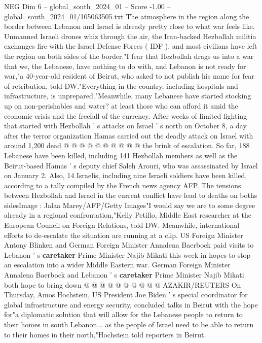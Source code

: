 \begin{textsample}{NEG Dim 6 – global\_south\_2024\_01 – Score -1.00 – global\_south\_2024\_01/105063505.txt}  \label{ex:f6_neg_347}
The atmosphere in the region along the border between Lebanon and Israel is already pretty close to what war feels like.
Unmanned Israeli drones whiz through the air, the Iran-backed Hezbollah militia exchanges fire with the Israel Defense Forces ( IDF ), and most civilians have left the region on both sides of the border."I fear that Hezbollah drags us into a war that we, the Lebanese, have nothing to do with, and Lebanon is not ready for war,"a 40-year-old resident of Beirut, who asked to not publish his name for fear of retribution, told DW."Everything in the country, including hospitals and infrastructure, is unprepared."Meanwhile, many Lebanese have started stocking up on non-perishables and water? at least those who can afford it amid the economic crisis and the freefall of the currency.
After weeks of limited fighting that started with Hezbollah ' s attacks on Israel ' s north on October 8, a day after the terror organization Hamas carried out the deadly attack on Israel with around 1,200 dead @ @ @ @ @ @ @ @ @ @ the brink of escalation.
So far, 188 Lebanese have been killed, including 141 Hezbollah members as well as the Beirut-based Hamas ' s deputy chief Saleh Arouri, who was assassinated by Israel on January 2.
Also, 14 Israelis, including nine Israeli soldiers have been killed, according to a tally compiled by the French news agency AFP.
The tensions between Hezbollah and Israel in the current conflict have lead to deaths on boths sidesImage : Jalaa Marey/AFP/Getty Images"I would say we are to some degree already in a regional confrontation,"Kelly Petillo, Middle East researcher at the European Council on Foreign Relations, told DW.
Meanwhile, international efforts to de-escalate the situation are running at a clip.
US Foreign Minister Antony Blinken and German Foreign Minister Annalena Baerbock paid visits to Lebanon ' s \textbf{caretaker} Prime Minister Najib Mikati this week in hopes to stop an escalation into a wider Middle Eastern war.
German Foreign Minister Annalena Baerbock and Lebanon ' s \textbf{caretaker} Prime Minister Najib Mikati both hope to bring down @ @ @ @ @ @ @ @ @ @ AZAKIR/REUTERS On Thursday, Amos Hochstein, US President Joe Biden ' s special coordinator for global infrastructure and energy security, concluded talks in Beirut with the hope for"a diplomatic solution that will allow for the Lebanese people to return to their homes in south Lebanon... as the people of Israel need to be able to return to their homes in their north,"Hochstein told reporters in Beirut.

\end{textsample}
